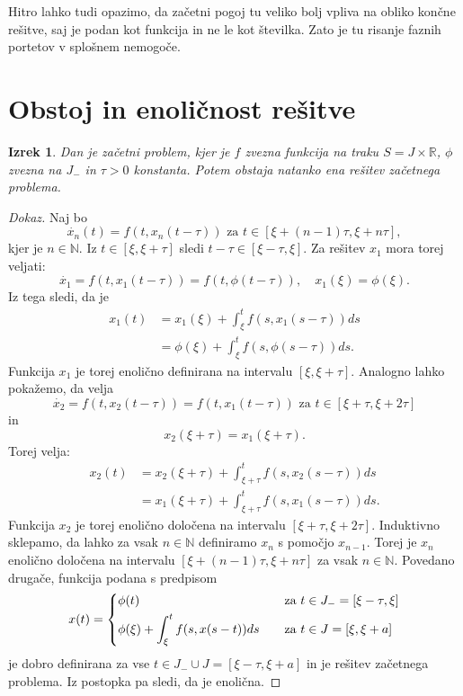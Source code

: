\documentclass[12pt,a4paper]{amsart}
\theoremstyle{definition} %
\theoremstyle{plain} %
\newtheorem{izrek}[definicija]{Izrek}
\newcommand{\R}{\mathbb R}
\newcommand{\N}{\mathbb N}
\begin{document}
Hitro lahko tudi opazimo, da začetni pogoj tu veliko bolj vpliva na obliko končne rešitve, saj je podan kot funkcija in 
ne le kot številka. Zato je tu risanje faznih portetov v splošnem nemogoče.


\section{Obstoj in enoličnost rešitve}

\begin{izrek}
    Dan je začetni problem, kjer je $f$ zvezna funkcija na traku $S=J \times \R$, $\phi$ zvezna na $J_{-}$ in $\tau >0$
    konstanta. Potem obstaja natanko ena rešitev začetnega problema.
\end{izrek}

\begin{proof}[Dokaz]
    Naj bo \[\dot{x_{n}}(t)=f(t,x_{n}(t-\tau)) \text{ za } t \in [\xi + (n-1)\tau,\xi + n\tau],\]
    kjer je $n \in \N$.
    Iz $t \in [\xi, \xi + \tau]$ sledi $t-\tau \in [\xi - \tau, \xi]$. Za rešitev $x_{1}$ mora torej veljati:
    \[\dot{x_{1}}=f(t,x_{1}(t-\tau))=f(t,\phi(t-\tau)),\quad x_{1}(\xi)=\phi(\xi).\]
    Iz tega sledi, da je
    \begin{equation*}
        \begin{split}
            x_{1}(t) &= x_{1}(\xi) + \int_{\xi}^{t}f(s, x_{1}(s-\tau))ds \\
            & = \phi(\xi) + \int_{\xi}^{t}f(s,\phi(s-\tau))ds.
        \end{split}      
        \end{equation*}
    Funkcija $x_{1}$ je torej enolično definirana na intervalu $[\xi, \xi + \tau]$. Analogno lahko pokažemo, da velja
    \[\dot{x_{2}}=f(t,x_{2}(t-\tau))=f(t,x_{1}(t-\tau)) \text{ za } t \in [\xi + \tau, \xi + 2\tau]\] in 
    \[x_{2}(\xi + \tau)=x_{1}(\xi + \tau).\]
    Torej velja:
    \begin{equation*}
        \begin{split}
            x_{2}(t) &= x_{2}(\xi + \tau) + \int_{\xi + \tau}^{t}f(s, x_{2}(s-\tau))ds \\
            & = x_{1}(\xi + \tau) + \int_{\xi + \tau}^{t}f(s, x_{1}(s-\tau))ds.
        \end{split}      
        \end{equation*}
    Funkcija $x_{2}$ je torej enolično določena na intervalu $[\xi + \tau,\xi + 2\tau]$. Induktivno sklepamo, da lahko za vsak 
    $n \in \N$ definiramo $x_{n}$ s pomočjo $x_{n-1}$. Torej je $x_{n}$ enolično določena na intervalu 
    $[\xi + (n-1)\tau, \xi + n\tau]$ za vsak $n \in \N$. Povedano drugače, funkcija podana s predpisom
    \[
        x(t) =
        \begin{dcases}
            \phi(t) &\quad \text{za  } t \in J_{-}=[\xi - \tau, \xi] \\
            \phi(\xi) + \int_{\xi}^{t}f(s,x(s-t))ds &\quad \text{za  } t \in J=[\xi, \xi +a] \\
        \end{dcases}
    \]
    je dobro definirana za vse $t \in J_{-} \cup J = [\xi - \tau, \xi + a]$ in je rešitev začetnega problema. Iz 
    postopka pa sledi, da je enolična.
\end{proof}
\end{document}
